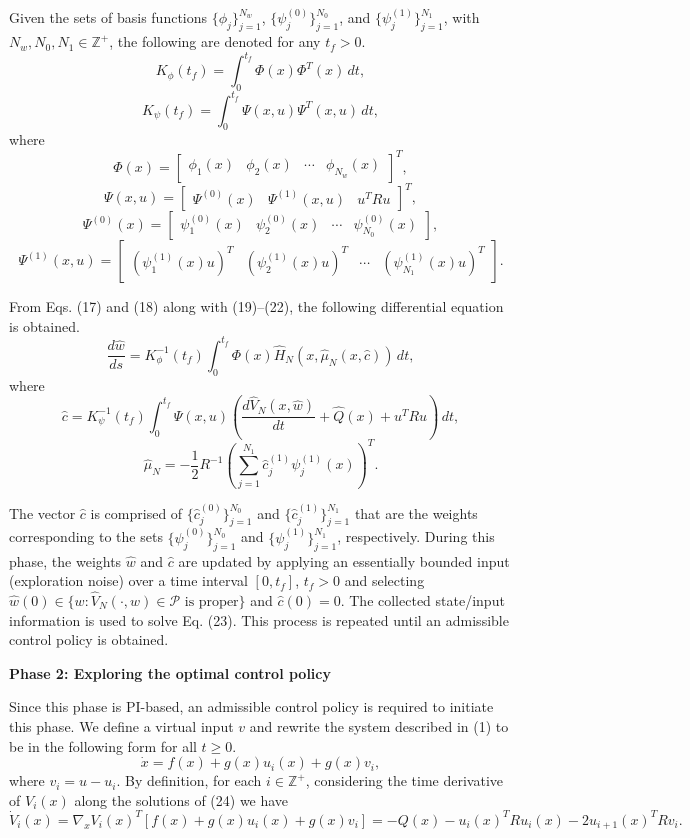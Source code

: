 \documentclass[12pt]{article}
\begin{document}
Given the sets of basis functions \( \{ \phi_j \}_{j=1}^{N_w} \), \( \{ \psi_j^{(0)} \}_{j=1}^{N_0} \), and \( \{ \psi_j^{(1)} \}_{j=1}^{N_1} \), with \( N_w, N_0, N_1 \in \mathbb{Z}^+ \), the following are denoted for any \( t_f > 0 \).
\[
K_\phi(t_f) = \int_0^{t_f} \Phi(x) \Phi^T(x) \, dt,
\]
\[
K_\psi(t_f) = \int_0^{t_f} \Psi(x, u) \Psi^T(x, u) \, dt,
\]
where
\[
\Phi(x) = \begin{bmatrix} \phi_1(x) & \phi_2(x) & \cdots & \phi_{N_w}(x) \end{bmatrix}^T,
\]
\[
\Psi(x, u) = \begin{bmatrix} \Psi^{(0)}(x) & \Psi^{(1)}(x, u) & u^T R u \end{bmatrix}^T,
\]
\[
\Psi^{(0)}(x) = \begin{bmatrix} \psi_1^{(0)}(x) & \psi_2^{(0)}(x) & \cdots & \psi_{N_0}^{(0)}(x) \end{bmatrix},
\]
\[
\Psi^{(1)}(x, u) = \begin{bmatrix} (\psi_1^{(1)}(x) u)^T & (\psi_2^{(1)}(x) u)^T & \cdots & (\psi_{N_1}^{(1)}(x) u)^T \end{bmatrix}.
\]

From Eqs. (17) and (18) along with (19)–(22), the following differential equation is obtained.
\[
\frac{d \hat{w}}{ds} = K_\phi^{-1}(t_f) \int_0^{t_f} \Phi(x) \hat{H}_N(x, \hat{\mu}_N(x, \hat{c})) \, dt,
\]
where
\[
\hat{c} = K_\psi^{-1}(t_f) \int_0^{t_f} \Psi(x, u) \left( \frac{d \hat{V}_N(x, \hat{w})}{dt} + \hat{Q}(x) + u^T R u \right) \, dt,
\]
\[
\hat{\mu}_N = -\frac{1}{2} R^{-1} \left( \sum_{j=1}^{N_1} \hat{c}_j^{(1)} \psi_j^{(1)}(x) \right)^T.
\]

The vector \( \hat{c} \) is comprised of \( \{ \hat{c}_j^{(0)} \}_{j=1}^{N_0} \) and \( \{ \hat{c}_j^{(1)} \}_{j=1}^{N_1} \) that are the weights corresponding to the sets \( \{ \psi_j^{(0)} \}_{j=1}^{N_0} \) and \( \{ \psi_j^{(1)} \}_{j=1}^{N_1} \), respectively. During this phase, the weights \( \hat{w} \) and \( \hat{c} \) are updated by applying an essentially bounded input (exploration noise) over a time interval \([0, t_f]\), \( t_f > 0 \) and selecting \( \hat{w}(0) \in \{ w : \hat{V}_N(\cdot, w) \in \mathcal{P} \text{ is proper} \} \) and \( \hat{c}(0) = 0 \). The collected state/input information is used to solve Eq. (23). This process is repeated until an admissible control policy is obtained.

\textbf{Phase 2: Exploring the optimal control policy}

Since this phase is PI-based, an admissible control policy is required to initiate this phase. We define a virtual input \( v \) and rewrite the system described in (1) to be in the following form for all \( t \geq 0 \).
\[
\dot{x} = f(x) + g(x) u_i(x) + g(x) v_i,
\]
where \( v_i = u - u_i \). By definition, for each \( i \in \mathbb{Z}^+ \), considering the time derivative of \( V_i(x) \) along the solutions of (24) we have
\[
\dot{V}_i(x) = \nabla_x V_i(x)^T [f(x) + g(x) u_i(x) + g(x) v_i] = -Q(x) - u_i(x)^T R u_i(x) - 2 u_{i+1}(x)^T R v_i.
\]
\end{document}
